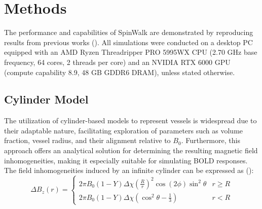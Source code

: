\section{Methods}

The performance and capabilities of SpinWalk are demonstrated by reproducing results from previous works (\cite{baez2017impact, scheffler2019bold, scheffler2021bold, boxerman1995mr, bieri2007effect, kim2012analysis, uludaug2009integrative}). All simulations were conducted on a desktop PC equipped with an AMD Ryzen Threadripper PRO 5995WX CPU (2.70 GHz base frequency, 64 cores, 2 threads per core) and an NVIDIA RTX 6000 GPU (compute capability 8.9, 48 GB GDDR6 DRAM), unless stated otherwise.


\subsection*{Cylinder Model}
The utilization of cylinder-based models to represent vessels is widespread due to their adaptable nature, facilitating exploration of parameters such as volume fraction, vessel radius, and their alignment relative to \(B_0\). Furthermore, this approach offers an analytical solution for determining the resulting magnetic field inhomogeneities, making it especially suitable for simulating BOLD responses. The field inhomogeneities induced by an infinite cylinder can be expressed as (\cite{ogawa1993functional}):
\begin{equation}
\Delta B_z(r) = \begin{cases}2\pi B_0(1-Y)\Delta\chi(\frac{R}{r})^{2}\cos(2\phi)\sin^{2}\theta & r\ge R\\2\pi B_0(1-Y)\Delta\chi\left(\cos^{2}\theta-\frac{1}{3}\right) & r<R\end{cases}
\label{eq:cylinder_b0}
\end{equation}

